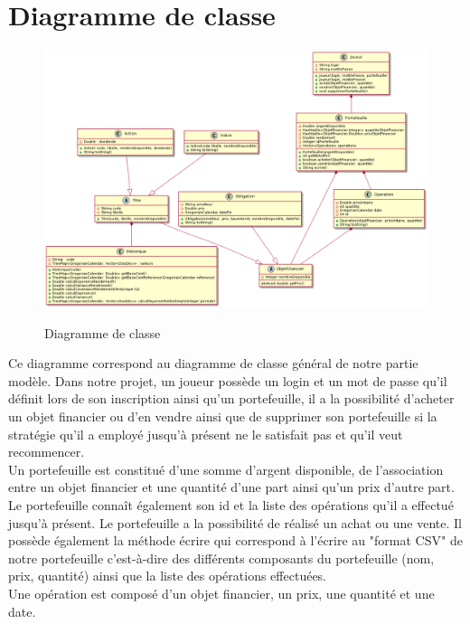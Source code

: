 \section{Diagramme de classe}

\begin{figure}[H]
  \center
  \includegraphics[scale=0.25]{../graph/DiagrammeClasseFinalModele.png} \\
  \caption{Diagramme de classe}
\end{figure}

Ce diagramme correspond au diagramme de classe général de notre partie modèle. Dans notre projet, un joueur possède un login et un mot de passe qu'il définit lors de son inscription ainsi qu'un portefeuille, il a la possibilité d'acheter un objet financier ou d'en vendre ainsi que de supprimer son portefeuille si la stratégie qu'il a employé jusqu'à présent ne le satisfait pas et qu'il veut recommencer. \\

Un portefeuille est constitué d'une somme d'argent disponible, de l’association entre un objet financier et une quantité d'une part ainsi qu'un prix d'autre part. Le portefeuille connaît également son id et la liste des opérations qu'il a effectué jusqu'à présent. Le portefeuille a la possibilité de réalisé un achat ou une vente. Il possède également la méthode écrire qui correspond à l'écrire au "format CSV" de notre portefeuille c'est-à-dire des différents composants du portefeuille (nom, prix, quantité) ainsi que la liste des opérations effectuées. \\

Une opération est composé d'un objet financier, un prix, une quantité et une date. \\

